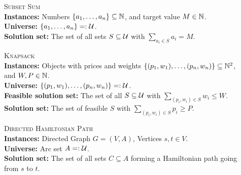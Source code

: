 \begin{samepage}
    \begin{mdframed}
    	\begin{description}   
        \item[]\textsc{Subset Sum}\hfill\\
        \textbf{Instances:} Numbers $\{ a_1, \ldots, a_n \} \subseteq \mathbb{N}$, and target value $M \in \mathbb{N}$.\\
        \textbf{Universe:} $\{ a_1, \ldots, a_n \} =: \mathcal{U}$.\\
        \textbf{Solution set:} The set of all sets $S \subseteq \mathcal{U}$ with $\sum_{a_i \in S}a_i = M$.
    	\end{description}
    \end{mdframed}
\end{samepage}

\begin{samepage}
    \begin{mdframed}
    	\begin{description}   
        \item[]\textsc{Knapsack}\hfill\\
        \textbf{Instances:} Objects with prices and weights $\{ (p_1, w_1), \ldots, (p_n, w_n) \} \subseteq \mathbb{N}^2$, and $W, P \in \mathbb{N}$.\\
        \textbf{Universe:} $\{ (p_1, w_1), \ldots, (p_n, w_n) \} =: \mathcal{U}$.\\
        \textbf{Feasible solution set:} The set of all $S \subseteq \mathcal{U}$ with $\sum_{(p_i, w_i) \in S}w_i \leq W$.\\
        \textbf{Solution set:} The set of feasible $S$ with $\sum_{(p_i, w_i) \in S} p_i \geq P$.
    	\end{description}
    \end{mdframed}
\end{samepage}

\begin{samepage}
    \begin{mdframed}
    	\begin{description}
        \item[]\textsc{Directed Hamiltonian Path}\hfill\\
        \textbf{Instances:} Directed Graph $G = (V, A)$, Vertices $s, t \in V$.\\
        \textbf{Universe:} Arc set $A =: \mathcal{U}$.\\
        \textbf{Solution set:} The set of all sets $C \subseteq A$ forming a Hamiltonian path going from $s$ to $t$.
    	\end{description}
    \end{mdframed}
\end{samepage}

